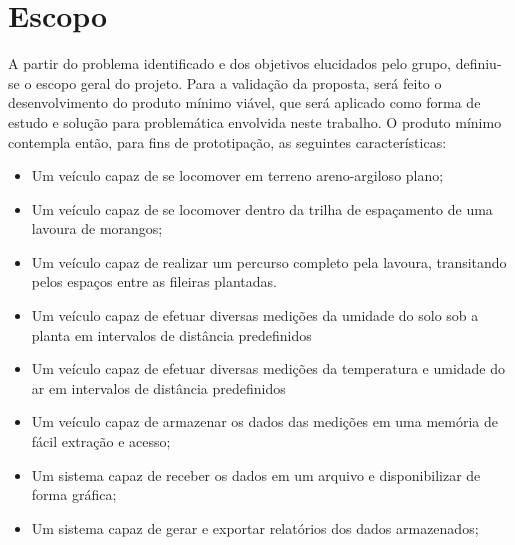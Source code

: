   \section{Escopo}

  A partir do problema identificado e dos objetivos elucidados pelo grupo,
  definiu-se o escopo geral do projeto. Para a validação da proposta, será feito
  o desenvolvimento do produto mínimo viável, que será aplicado como forma de
  estudo e solução para problemática envolvida neste trabalho. O produto mínimo
  contempla então, para fins de prototipação, as seguintes características:

  \begin{itemize}
    \item Um veículo capaz de se locomover em terreno areno-argiloso plano;
    \item Um veículo capaz de se locomover dentro da trilha de espaçamento de uma lavoura de morangos;
    \item Um veículo capaz de realizar um percurso completo pela lavoura, transitando pelos espaços entre as fileiras plantadas.
    \item Um veículo capaz de efetuar diversas medições da umidade do solo sob a planta em intervalos de distância predefinidos
    \item Um veículo capaz de  efetuar diversas medições da temperatura e umidade do ar em intervalos de distância predefinidos 
    \item Um veículo capaz de armazenar os dados das medições em uma memória de fácil extração e acesso;
    \item Um sistema capaz de receber os dados em um arquivo e disponibilizar de forma gráfica;
    \item Um sistema capaz de gerar e exportar relatórios dos dados armazenados;
  \end{itemize}
